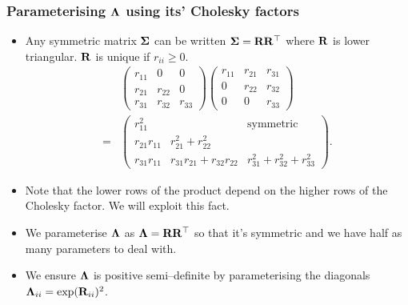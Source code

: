 \documentclass{beamer}
\begin{document}
	\begin{frame}
		\frametitle{Parameterising ${\boldsymbol \Lambda}$ using its' Cholesky factors}
		\begin{itemize}
			\item Any symmetric matrix ${\boldsymbol \Sigma}$ can be written ${\boldsymbol \Sigma} = {\bf R} {\bf R}^\top$
			      where ${\bf R}$ is lower triangular. ${\bf R}$ is unique if $r_{ii} \geq 0$. 
			      \begin{align*}
			      	&\begin{pmatrix}
			      	r_{11}        & 0                            & 0                               \\
			      	r_{21}        & r_{22}                       & 0                               \\
			      	r_{31}        & r_{32}                       & r_{33}                          
			      	\end{pmatrix}
			      	\begin{pmatrix}
			      	r_{11}        & r_{21}                       & r_{31}                          \\
			      	0             & r_{22}                       & r_{32}                          \\
			      	0             & 0                            & r_{33}                          
			      	\end{pmatrix}
			      	\\
			      	=& \begin{pmatrix}
			      	r_{11}^2      &                              & \text{symmetric}                \\
			      	r_{21}r_{11} & r_{21}^2 + r_{22}^2 \\
			      	r_{31} r_{11} & r_{31}r_{21} + r_{32} r_{22} & r_{31}^2 + r_{32} ^2 + r_{33}^2 
			      	\end{pmatrix}.
			      \end{align*}
			\item Note that the lower rows of the product depend on the higher rows of the Cholesky factor. We will
			      exploit this fact.
			\item We parameterise ${\boldsymbol \Lambda}$ as ${\boldsymbol \Lambda} = {\bf R} {\bf R}^\top$ so that it's symmetric
			      and	we have half as many parameters to deal with.
			\item We ensure ${\boldsymbol \Lambda}$ is positive semi--definite by parameterising the diagonals
			      ${\boldsymbol \Lambda}_{ii} = \exp({\bf R}_{ii})^2$.
		\end{itemize}	
	\end{frame}
			
\end{document}

